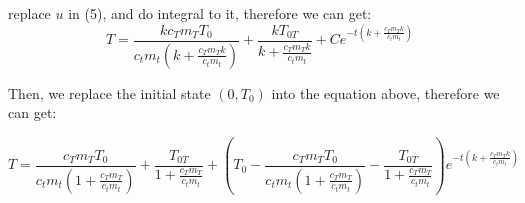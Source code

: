 \documentclass{article}
\begin{document}
replace $u$ in (5), and do integral to it, therefore we can get:
\begin{equation}
T = \frac{k c_T m_T T_0}{c_t m_t (k + \frac{c_T m_T k}{c_t m_t})} + \frac{k T_{0T}}{k + \frac{c_T m_T k}{c_t m_t}} + Ce^{-t(k + \frac{c_T m_T k}{c_t m_t})}
\end{equation}

Then, we replace the initial state $(0, T_0)$ into the equation above, therefore we can get:

\begin{equation}
T = \frac{c_T m_T T_0}{c_t m_t (1 + \frac{c_T m_T}{c_t m_t})} + \frac{T_{0T}}{1 + \frac{c_Tm_T}{c_tm_t}} + (T_0 - \frac{c_Tm_TT_0}{c_tm_t(1+\frac{c_Tm_T}{c_tm_t})} - \frac{T_{0T}}{1 + \frac{c_Tm_T}{c_tm_t}})e^{-t(k + \frac{c_Tm_Tk}{c_tm_t})}
\end{equation}
\end{document}
